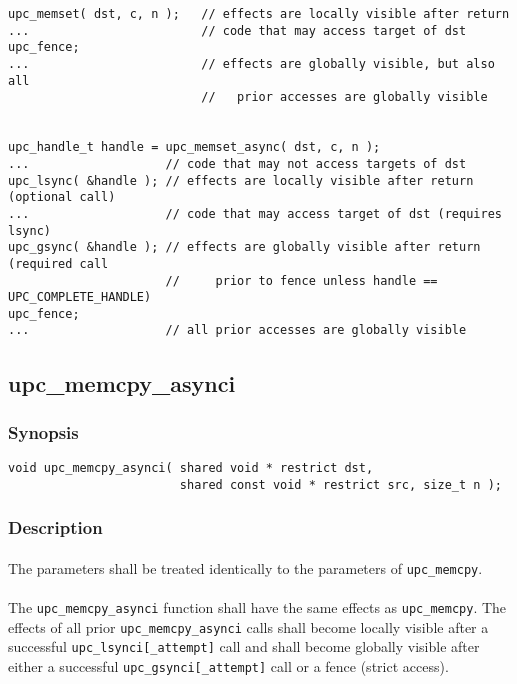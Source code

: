 \documentclass[10pt]{article}
\def \memcpy  {{\tt upc\_memcpy}}
\def \gsynci {{\tt upc\_gsynci[\_attempt]}}
\def \lsynci {{\tt upc\_lsynci[\_attempt]}}
\begin{document}
\begin{verbatim}
upc_memset( dst, c, n );   // effects are locally visible after return
...                        // code that may access target of dst
upc_fence;                 
...                        // effects are globally visible, but also all
                           //   prior accesses are globally visible


upc_handle_t handle = upc_memset_async( dst, c, n );
...                   // code that may not access targets of dst
upc_lsync( &handle ); // effects are locally visible after return (optional call)
...                   // code that may access target of dst (requires lsync)
upc_gsync( &handle ); // effects are globally visible after return (required call
                      //     prior to fence unless handle == UPC_COMPLETE_HANDLE)
upc_fence;
...                   // all prior accesses are globally visible
\end{verbatim}

\newpage
\subsection{upc\_memcpy\_asynci}
\def\function{{\tt upc\_memcpy\_asynci}}

\subsubsection{Synopsis}

\begin{verbatim}
void upc_memcpy_asynci( shared void * restrict dst,
                        shared const void * restrict src, size_t n );
\end{verbatim}

\subsubsection{Description}

\paragraph{} The parameters shall be treated identically to the parameters of
\memcpy{}.

\paragraph{} The \function{} function shall have the same effects as \memcpy{}.
The effects of all prior \function{} calls shall become locally visible after a
successful \lsynci{} call and shall become globally visible after either a
successful \gsynci{} call or a fence (strict access).
\end{document}
